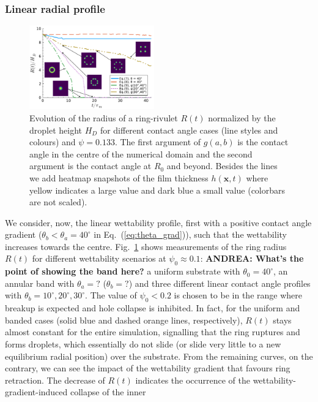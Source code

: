 \documentclass[twoside,twocolumn,9pt]{article}
\begin{document}
\subsubsection{Linear radial profile}\label{subsubsec:linwettgrad}
\begin{figure}
    \centering
    \includegraphics[width=0.48\textwidth]{assets/grad_heatmap.pdf}
    \caption{Evolution of the radius of a ring-rivulet $R(t)$ normalized by the droplet height $H_D$ for different contact angle cases (line styles and colours) and $\psi = 0.133$.
    The first argument of $g(a,b)$ is the contact angle in the centre of the numerical domain and the second argument is the contact angle at $R_0$ and beyond. 
    Besides the lines we add heatmap snapshots of the film thickness $h(\mathbf{x},t)$ where yellow indicates a large value and dark blue a small value (colorbars are not scaled).}
    \label{fig:negativewetgrad}
\end{figure}
We consider, now, the linear wettability profile, first with a positive contact angle gradient ($\theta_b < \theta_a=40^{\circ}$ in Eq.~(\ref{eq:theta_grad})), such that the wettability increases towards the centre. 
Fig.~\ref{fig:negativewetgrad} shows measurements of the ring radius $R(t)$ for different wettability scenarios at $\psi_0 \approx 0.1$: {\bf ANDREA: What's the point of showing the band here?} a uniform substrate with $\theta_0 = 40^{\circ}$, an annular band with $\theta_a =?$ ($\theta_b =?$) and three different linear contact angle profiles with $\theta_b = 10^{\circ}, 20^{\circ}, 30^{\circ}$. The value of $\psi_0<0.2$ is chosen to be in the range where breakup is expected and hole collapse is inhibited.
In fact, for the uniform and banded cases (solid blue and dashed orange lines, respectively),
$R(t)$ stays almost constant for the entire simulation, signalling that 
the ring ruptures and forms droplets, which essentially do not slide (or slide very little to a new equilibrium radial position) over the substrate.
From the remaining curves, on the contrary, we can see the impact of the wettability gradient that favours ring retraction. 
The decrease of $R(t)$ indicates the occurrence of the wettability-gradient-induced collapse of the inner 
\end{document}
